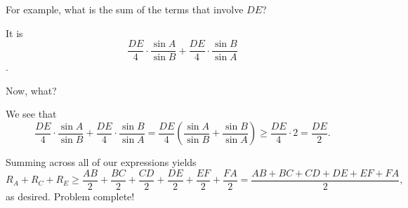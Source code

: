 For example, what is the sum of the terms that involve $DE$?





It is  $$\frac{DE}{4}\cdot\frac{\sin A}{\sin B} + \frac{DE}{4}\cdot\frac{\sin B}{\sin A} $$.

Now, what?



We see that $$\frac{DE}{4}\cdot\frac{\sin A}{\sin B} + \frac{DE}{4}\cdot\frac{\sin B}{\sin A} = \frac{DE}{4}\left(\frac{\sin A}{\sin B} + \frac{\sin B}{\sin A}\right) \ge \frac{DE}{4}\cdot 2 = \frac{DE}{2}.$$



Summing across all of our expressions yields $$R_A + R_C + R_E \ge \frac{AB}{2} + \frac{BC}{2} + \frac{CD}{2} + \frac{DE}{2} + \frac{EF}{2} + \frac{FA}{2} = \frac{AB+BC+CD+DE+EF+FA}{2},$$ as desired. Problem complete!



